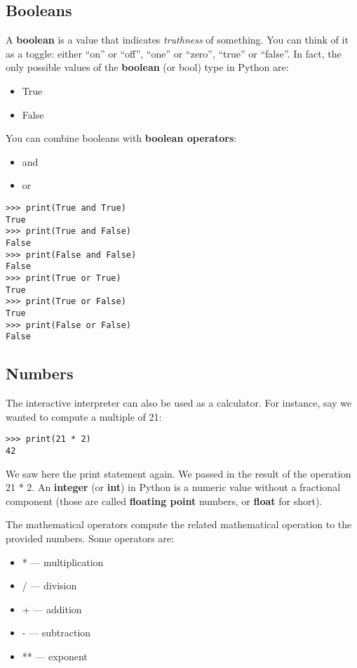 \subsection{Booleans}\label{booleans}

A \textbf{boolean} is a value that indicates \emph{truthness} of
something. You can think of it as a toggle: either ``on'' or ``off'',
``one'' or ``zero'', ``true'' or ``false''. In fact, the only possible
values of the \textbf{boolean} (or bool) type in Python are:

\begin{itemize}
\tightlist
\item
  True
\item
  False
\end{itemize}

You can combine booleans with \textbf{boolean operators}:

\begin{itemize}
\tightlist
\item
  and
\item
  or
\end{itemize}

\begin{verbatim}
>>> print(True and True)
True
>>> print(True and False)
False
>>> print(False and False)
False
>>> print(True or True)
True
>>> print(True or False)
True
>>> print(False or False)
False
\end{verbatim}

\subsection{Numbers}\label{numbers}

The interactive interpreter can also be used as a calculator. For
instance, say we wanted to compute a multiple of 21:

\begin{verbatim}
>>> print(21 * 2)
42
\end{verbatim}

We saw here the print statement again. We passed in the result of the
operation 21 * 2. An \textbf{integer} (or \textbf{int}) in Python is a
numeric value without a fractional component (those are called
\textbf{floating point} numbers, or \textbf{float} for short).

The mathematical operators compute the related mathematical operation to
the provided numbers. Some operators are:

\begin{itemize}
\tightlist
\item
  * --- multiplication
\item
  / --- division
\item
  + --- addition
\item
  - --- subtraction
\item
  ** --- exponent
\end{itemize}

